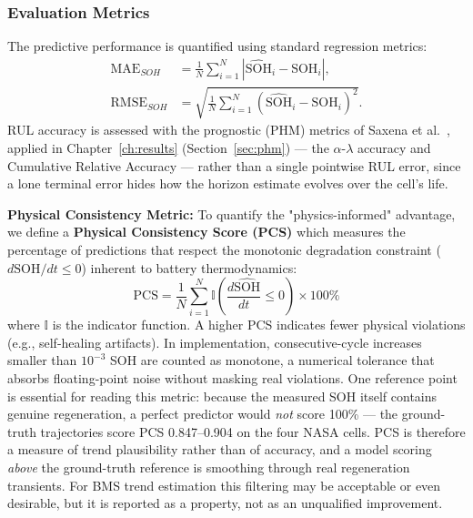 \subsubsection{Evaluation Metrics}
The predictive performance is quantified using standard regression metrics:
\begin{align}
\text{MAE}_{SOH} &= \frac{1}{N} \sum_{i=1}^{N} |\widehat{\text{SOH}}_i - \text{SOH}_i|, \\
\text{RMSE}_{SOH} &= \sqrt{ \frac{1}{N} \sum_{i=1}^{N} (\widehat{\text{SOH}}_i - \text{SOH}_i)^2 }.
\end{align}
RUL accuracy is assessed with the prognostic (PHM) metrics of Saxena et
al.~\cite{saxena_metrics}, applied in Chapter~\ref{ch:results}
(Section~\ref{sec:phm}) --- the $\alpha$-$\lambda$ accuracy and Cumulative
Relative Accuracy --- rather than a single pointwise RUL error, since a lone
terminal error hides how the horizon estimate evolves over the cell's life.

\noindent
\textbf{Physical Consistency Metric:} To quantify the "physics-informed" advantage, we define a \textbf{Physical Consistency Score (PCS)} which measures the percentage of predictions that respect the monotonic degradation constraint ($d\text{SOH}/dt \le 0$) inherent to battery thermodynamics:
\[
\text{PCS} = \frac{1}{N} \sum_{i=1}^{N} \mathbb{I}\left(\frac{d\widehat{\text{SOH}}}{dt} \le 0\right) \times 100\%
\]
where $\mathbb{I}$ is the indicator function. A higher PCS indicates fewer physical violations (e.g., self-healing artifacts). In implementation, consecutive-cycle increases smaller than $10^{-3}$ SOH are counted as monotone, a numerical tolerance that absorbs floating-point noise without masking real violations. One reference point is essential for reading this metric: because the measured SOH itself contains genuine regeneration, a perfect predictor would \emph{not} score 100\% --- the ground-truth trajectories score PCS 0.847--0.904 on the four NASA cells. PCS is therefore a measure of trend plausibility rather than of accuracy, and a model scoring \emph{above} the ground-truth reference is smoothing through real regeneration transients. For BMS trend estimation this filtering may be acceptable or even desirable, but it is reported as a property, not as an unqualified improvement.

